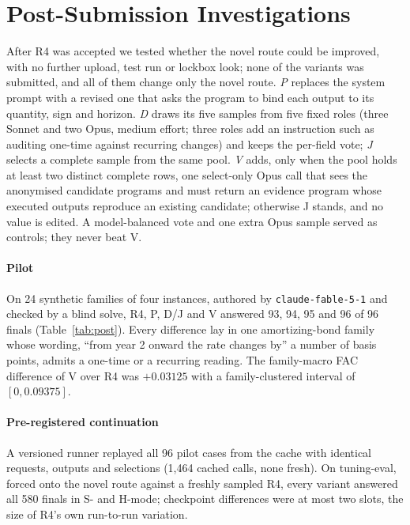 \documentclass[conference]{IEEEtran}
\newcommand{\id}[1]{\texttt{#1}}
\begin{document}
\section{Post-Submission Investigations}\label{sec:post}

After R4 was accepted we tested whether the novel route could be improved, with no further upload, test run or lockbox look; none of the variants was submitted, and all of them change only the novel route. \emph{P} replaces the system prompt with a revised one that asks the program to bind each output to its quantity, sign and horizon. \emph{D} draws its five samples from five fixed roles (three Sonnet and two Opus, medium effort; three roles add an instruction such as auditing one-time against recurring changes) and keeps the per-field vote; \emph{J} selects a complete sample from the same pool. \emph{V} adds, only when the pool holds at least two distinct complete rows, one select-only Opus call that sees the anonymised candidate programs and must return an evidence program whose executed outputs reproduce an existing candidate; otherwise J stands, and no value is edited. A model-balanced vote and one extra Opus sample served as controls; they never beat V.

\paragraph*{Pilot} On 24 synthetic families of four instances, authored by \id{claude-fable-5-1} and checked by a blind solve, R4, P, D/J and V answered 93, 94, 95 and 96 of 96 finals (Table~\ref{tab:post}). Every difference lay in one amortizing-bond family whose wording, ``from year 2 onward the rate changes by'' a number of basis points, admits a one-time or a recurring reading. The family-macro FAC difference of V over R4 was $+0.03125$ with a family-clustered interval of $[0,0.09375]$.

\paragraph*{Pre-registered continuation} A versioned runner replayed all 96 pilot cases from the cache with identical requests, outputs and selections (1,464 cached calls, none fresh). On tuning-eval, forced onto the novel route against a freshly sampled R4, every variant answered all 580 finals in S- and H-mode; checkpoint differences were at most two slots, the size of R4's own run-to-run variation.
\end{document}
